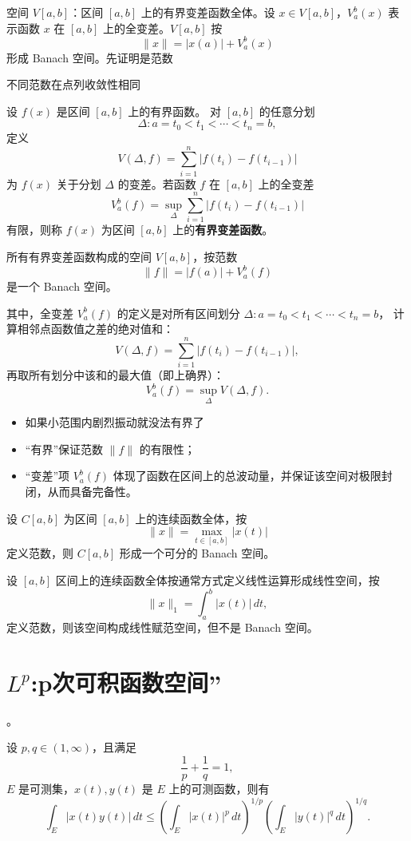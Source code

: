 \begin{example}
空间 $V[a,b]$：区间 $[a,b]$ 上的有界变差函数全体。设 $x\in V[a,b]$，$V_a^b(x)$ 表示函数 $x$ 在 $[a,b]$ 上的全变差。$V[a,b]$ 按
\[
\|x\| = |x(a)| + V_a^b(x)
\]
形成 Banach 空间。先证明是范数
\end{example}
\begin{dxtips}
    不同范数在点列收敛性相同
\end{dxtips}
\begin{definition}[有界变差函数]
设 $f(x)$ 是区间 $[a,b]$ 上的有界函数。  
对 $[a,b]$ 的任意分划
\[
\Delta: a = t_0 < t_1 < \cdots < t_n = b,
\]
定义
\[
V(\Delta,f) = \sum_{i=1}^{n} \big| f(t_i) - f(t_{i-1}) \big|
\]
为 $f(x)$ 关于分划 $\Delta$ 的变差。若函数 $f$ 在 $[a,b]$ 上的全变差
\[
V_a^b(f) = \sup_{\Delta} \sum_{i=1}^{n} \big| f(t_i) - f(t_{i-1}) \big|
\]
有限，则称 $f(x)$ 为区间 $[a,b]$ 上的\textbf{有界变差函数}。
\end{definition}
\begin{remark}
所有有界变差函数构成的空间 $V[a,b]$，按范数
\[
\|f\| = |f(a)| + V_a^b(f)
\]
是一个 Banach 空间。

其中，全变差 $V_a^b(f)$ 的定义是对所有区间划分 $\Delta: a=t_0<t_1<\cdots<t_n=b$，
计算相邻点函数值之差的绝对值和：
\[
V(\Delta,f) = \sum_{i=1}^{n} |f(t_i) - f(t_{i-1})|,
\]
再取所有划分中该和的最大值（即上确界）：
\[
V_a^b(f) = \sup_{\Delta} V(\Delta,f).
\]
\begin{dxtips}
    

\begin{itemize}
\item 如果小范围内剧烈振动就没法有界了
  \item “有界”保证范数 $\|f\|$ 的有限性；
  \item “变差”项 $V_a^b(f)$ 体现了函数在区间上的总波动量，并保证该空间对极限封闭，从而具备完备性。
\end{itemize}
\end{dxtips}
\end{remark}
\begin{example}
设 $C[a,b]$ 为区间 $[a,b]$ 上的连续函数全体，按
\[
\|x\| = \max_{t \in [a,b]} |x(t)|
\]
定义范数，则 $C[a,b]$ 形成一个可分的 Banach 空间。
\end{example}

\begin{example}
设 $[a,b]$ 区间上的连续函数全体按通常方式定义线性运算形成线性空间，按
\[
\|x\|_1 = \int_a^b |x(t)|\,dt,
\]
定义范数，则该空间构成线性赋范空间，但不是 Banach 空间。
\end{example}
\section{$L^p$:p次可积函数空间”}。
\begin{lemma}\label{lem:holder}
设 $p,q\in(1,\infty)$，且满足
\[
\frac{1}{p}+\frac{1}{q}=1,
\]
$E$ 是可测集，$x(t),y(t)$ 是 $E$ 上的可测函数，则有
\[
\int_E |x(t)y(t)|\,dt
\le
\left(\int_E |x(t)|^p\,dt\right)^{\!1/p}
\left(\int_E |y(t)|^q\,dt\right)^{\!1/q}.
\]
\end{lemma}

